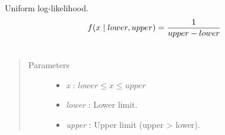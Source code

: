 \documentclass[letterpaper,10pt,english]{sphinxmanual}
\begin{document}
\begin{fulllineitems}
\label{distributions:pymc.distributions.uniform_like}
Uniform log-likelihood.
\begin{gather}
\begin{split}f(x \mid lower, upper) = \frac{1}{upper-lower}\end{split}\notag\\\begin{split}\end{split}\notag
\end{gather}\begin{quote}\begin{description}
\item[{Parameters }] \leavevmode\begin{itemize}
\item {} 
\emph{x} : $lower \leq x \leq upper$

\item {} 
\emph{lower} : Lower limit.

\item {} 
\emph{upper} : Upper limit (upper \textgreater{} lower).

\end{itemize}

\end{description}\end{quote}

\end{fulllineitems}

\end{document}

